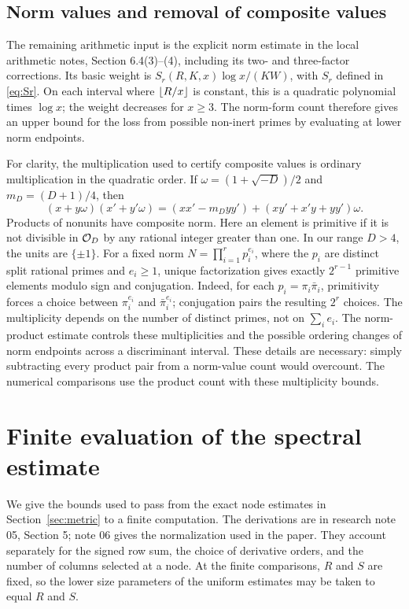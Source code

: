 \subsection{Norm values and removal of composite values}
The remaining arithmetic input is the explicit norm estimate in the local arithmetic notes, Section 6.4(3)--(4), including its two- and three-factor corrections. Its basic weight is $S_r(R,K,x)\log x/(KW)$, with $S_r$ defined in \eqref{eq:Sr}. On each interval where $\left\lfloor R/x\right\rfloor$ is constant, this is a quadratic polynomial times $\log x$; the weight decreases for $x\geq3$. The norm-form count therefore gives an upper bound for the loss from possible non-inert primes by evaluating at lower norm endpoints.

For clarity, the multiplication used to certify composite values is ordinary multiplication in the quadratic order. If $\omega=(1+\sqrt{-D})/2$ and $m_D=(D+1)/4$, then
\[
 (x+y\omega)(x'+y'\omega)
 =(xx'-m_Dyy')+(xy'+x'y+yy')\omega.
\]
Products of nonunits have composite norm. Here an element is primitive if
it is not divisible in $\mathcal O_D$ by any rational integer greater than one. In our range $D>4$, the units are $\{\pm1\}$. For a fixed norm $N=\prod_{i=1}^r p_i^{e_i}$, where the $p_i$ are distinct split rational primes and $e_i\geq1$, unique factorization gives exactly $2^{r-1}$ primitive elements modulo sign and conjugation. Indeed, for each $p_i=\pi_i\bar\pi_i$, primitivity forces a choice between $\pi_i^{e_i}$ and $\bar\pi_i^{e_i}$; conjugation pairs the resulting $2^r$ choices. The multiplicity depends on the number of distinct primes, not on $\sum_i e_i$. The norm-product estimate controls these multiplicities and the possible ordering changes of norm endpoints across a discriminant interval. These details are necessary: simply subtracting every product pair from a norm-value count would overcount. The numerical comparisons use the product count with these multiplicity bounds.

\section{Finite evaluation of the spectral estimate}\label{app:metric}
We give the bounds used to pass from the exact node estimates in Section~\ref{sec:metric} to a finite computation. The derivations are in research note 05, Section 5; note 06 gives the normalization used in the paper. They account separately for the signed row sum, the choice of derivative orders, and the number of columns selected at a node. At the finite comparisons, $R$ and $S$ are fixed, so the lower size parameters of the uniform estimates may be taken to equal $R$ and $S$.

